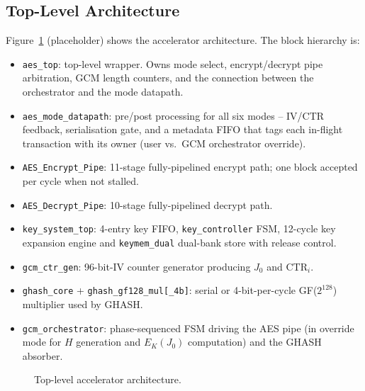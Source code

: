 \documentclass[conference,10pt,a4paper]{IEEEtran}
\begin{document}
\subsection{Top-Level Architecture}
Figure~\ref{fig:arch} (placeholder) shows the accelerator architecture.
The block hierarchy is:
\begin{itemize}[leftmargin=*]
  \item \texttt{aes\_top}: top-level wrapper.  Owns mode select,
        encrypt/decrypt pipe arbitration, GCM length counters, and the
        connection between the orchestrator and the mode datapath.
  \item \texttt{aes\_mode\_datapath}: pre/post processing for all six
        modes -- IV/CTR feedback, serialisation gate, and a
        metadata FIFO that tags each in-flight transaction with its
        owner (user vs.\ GCM orchestrator override).
  \item \texttt{AES\_Encrypt\_Pipe}: 11-stage fully-pipelined encrypt
        path; one block accepted per cycle when not stalled.
  \item \texttt{AES\_Decrypt\_Pipe}: 10-stage fully-pipelined decrypt
        path.
  \item \texttt{key\_system\_top}: 4-entry key FIFO,
        \texttt{key\_controller} FSM, 12-cycle key expansion engine
        \cite{daemenrijmen} and \texttt{keymem\_dual} dual-bank store
        with release control.
  \item \texttt{gcm\_ctr\_gen}: 96-bit-IV counter generator producing
        $J_0$ and $\mathrm{CTR}_i$.
  \item \texttt{ghash\_core} + \texttt{ghash\_gf128\_mul[\_4b]}: serial
        or 4-bit-per-cycle GF($2^{128}$) multiplier used by GHASH.
  \item \texttt{gcm\_orchestrator}: phase-sequenced FSM driving the AES
        pipe (in override mode for $H$ generation and $E_K(J_0)$
        computation) and the GHASH absorber.
\end{itemize}

\begin{figure}[t]
  \centering
  \caption{Top-level accelerator architecture.}
  \label{fig:arch}
\end{figure}
\end{document}
